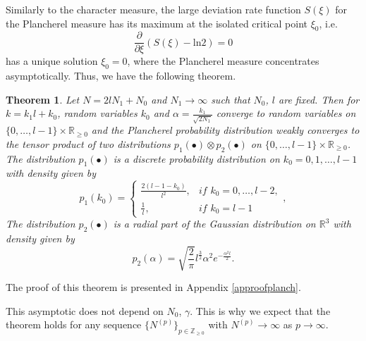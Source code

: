 \documentclass[11pt]{amsart}
\newtheorem{theorem}{Theorem}[section]
\begin{document}
Similarly to the character measure, the large deviation rate function $S(\xi)$ for the Plancherel measure has its maximum at the isolated critical point $\xi_0$, i.e.
\begin{equation*}
\frac{\partial}{\partial\xi}(S(\xi)-\mathrm{ln}2)=0
\end{equation*}
has a unique solution $\xi_0=0$, where the Plancherel measure concentrates asymptotically. Thus, we have the following theorem.
\begin{theorem}\label{planchfluct}
    Let $N=2lN_1+N_0$ and $N_1\to\infty$ such that $N_0$, $l$ are fixed. Then for $k=k_1l+k_0$, random variables $k_0$ and $\alpha=\frac{k_1}{\sqrt{2N_1}}$ converge to random variables on $\{0,\ldots,l-1\}\times \mathbb{R}_{\geq 0}$ and the Plancherel probability distribution weakly converges to the tensor product of two distributions $p_1(\bullet)\otimes p_2(\bullet)$ on $\{0,\ldots,l-1\}\times \mathbb{R}_{\geq 0}$. The distribution $p_1(\bullet)$ is a discrete probability distribution on $k_0=0,1,\ldots,l-1$ with density given by
	\begin{equation*}
	p_1(k_0)=\begin{cases}
	\frac{2(l-1-k_0)}{l^2},& \textit{if $k_0=0,\ldots,l-2$},\\
	\frac{1}{l},& \textit{if $k_0=l-1$}
	\end{cases},
	\end{equation*}
	The distribution $p_2(\bullet)$ is a radial part of the Gaussian distribution on $\mathbb{R}^3$ with density given by
    \begin{equation*}
    p_2(\alpha)=\sqrt{\frac{2}{\pi}}l^{\frac{3}{2}}\alpha^2e^{-\frac{\alpha^2 l}{2}}.
    \end{equation*}
\end{theorem}
The proof of this theorem is presented in Appendix \ref{approofplanch}.

This asymptotic does not depend on $N_0$, $\gamma$. This is why we expect that the theorem holds for any sequence $\{N^{(p)}\}_{p\in\mathbb{Z}_{\geq 0}}$ with $N^{(p)}\to\infty$ as $p\to\infty$.
\end{document}
